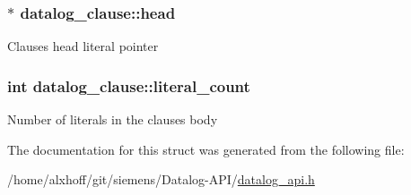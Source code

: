 \subsubsection[{\texorpdfstring{head}{head}}]{$\ast$ datalog\+\_\+clause\+::head}\hypertarget{structdatalog__clause_a76efe58a26d93f778904a8ab8f7e12d6}{}\label{structdatalog__clause_a76efe58a26d93f778904a8ab8f7e12d6}
Clause\textquotesingle{}s head literal pointer 
\subsubsection[{\texorpdfstring{literal\+\_\+count}{literal_count}}]{\setlength{\rightskip}{0pt plus 5cm}int datalog\+\_\+clause\+::literal\+\_\+count}\hypertarget{structdatalog__clause_abcd26a3624b9be0f775ca0828bb2deb9}{}\label{structdatalog__clause_abcd26a3624b9be0f775ca0828bb2deb9}
Number of literals in the clause\textquotesingle{}s body 

The documentation for this struct was generated from the following file\+:\begin{DoxyCompactItemize}
\item 
/home/alxhoff/git/siemens/\+Datalog-\/\+A\+P\+I/\hyperlink{datalog__api_8h}{datalog\+\_\+api.\+h}\end{DoxyCompactItemize}
